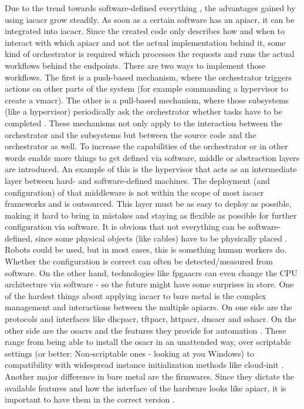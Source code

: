 Due to the trend towards software-defined everything \cite{sde_deloitte} \cite{sde_researchgate}, the advantages gained by using \gls{iacacr} grow steadily. As soon as a certain software has an \gls{apiacr}, it can be integrated into \gls{iacacr}. Since the created code only describes how and when to interact with which \gls{apiacr} and not the actual implementation behind it, some kind of orchestrator is required which processes the requests and runs the actual workflows behind the endpoints.
\newline
There are two ways to implement those workflows. The first is a push-based mechanism, where the orchestrator triggers actions on other parts of the system (for example commanding a hypervisor to create a \gls{vmacr}). The other is a pull-based mechanism, where those subsystems (like a hypervisor) periodically ask the orchestrator whether tasks have to be completed \cite{infoworld_puppet_chef_ansible_salt}.
\newline
These mechanisms not only apply to the interaction between the orchestrator and the subsystems but between the source code and the orchestrator as well.
\newline
To increase the capabilities of the orchestrator or in other words enable more things to get defined via software, middle or abstraction layers are introduced. An example of this is the hypervisor that acts as an intermediate layer between hard- and software-defined machines. The deployment (and configuration) of that middleware is not within the scope of most \gls{iacacr} frameworks and is outsourced. This layer must be as easy to deploy as possible, making it hard to bring in mistakes and staying as flexible as possible for further configuration via software.
\newline
It is obvious that not everything can be software-defined, since some physical objects (like cables) have to be physically placed \cite{iac_bare_metal}. Robots could be used, but in most cases, this is something human workers do. Whether the configuration is correct can often be detected/measured from software. On the other hand, technologies like \gls{fpgaacr}s can even change the CPU architecture via software - so the future might have some surprises in store.
\newline
One of the hardest things about applying \gls{iacacr} to bare metal is the complex management and interactions between the multiple \gls{apiacr}s. On one side are the  protocols and interfaces like \gls{dhcpacr}, \gls{tftpacr}, \gls{httpacr}, \gls{dnsacr} and \gls{sshacr}. On the other side are the \gls{osacr}s and the features they provide for automation \cite{iac_bare_metal}.
These range from being able to install the \gls{osacr} in an unattended way, over scriptable settings (or better: Non-scriptable ones - looking at you Windows) to compatibility with widespread instance initialization methods like cloud-init \cite{cloudinit_docs}.
\newline
Another major difference in bare metal are the firmwares. Since they dictate the available features and how the interface of the hardware looks like \gls{apiacr}, it is important to have them in the correct version \cite{iac_bare_metal}.

